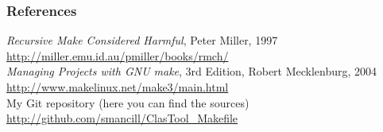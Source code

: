 \documentclass[11pt]{beamer}
\begin{document}

\begin{frame}[t]
  \frametitle{References}

  \begin{thebibliography}{99}
     \emph{Recursive Make Considered Harmful}, Peter Miller,
      1997\\
      \url{http://miller.emu.id.au/pmiller/books/rmch/}\\[7mm]
     \emph{Managing Projects with GNU make}, 3rd Edition, Robert
      Mecklenburg, 2004\\
      \url{http://www.makelinux.net/make3/main.html}\\[7mm]
     My Git repository (here you can find the sources)\\
      \url{http://github.com/smancill/ClasTool_Makefile}
  \end{thebibliography}
\end{frame}

\end{document}
